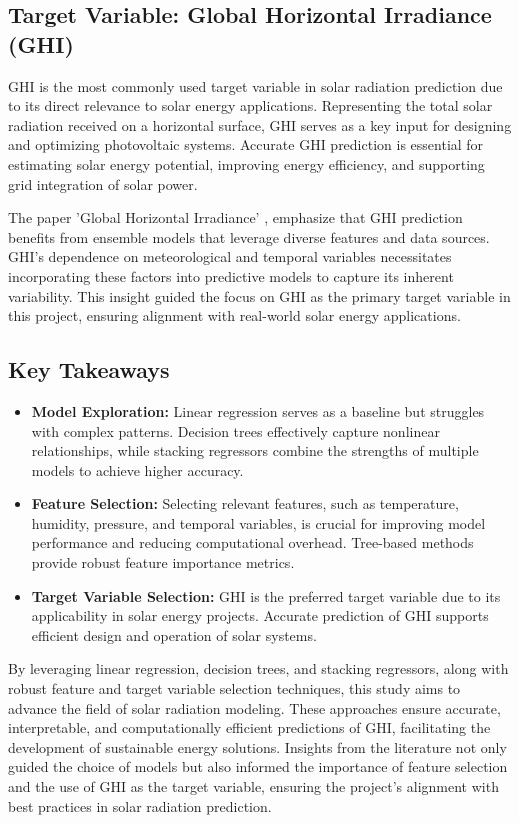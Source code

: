 \documentclass[10pt,twocolumn]{article}
\begin{document}
\subsection{Target Variable: Global Horizontal Irradiance (GHI)}
GHI is the most commonly used target variable in solar radiation prediction due to its direct relevance to solar energy applications. Representing the total solar radiation received on a horizontal surface, GHI serves as a key input for designing and optimizing photovoltaic systems. Accurate GHI prediction is essential for estimating solar energy potential, improving energy efficiency, and supporting grid integration of solar power.

The paper 'Global Horizontal Irradiance' \cite{8}, emphasize that GHI prediction benefits from ensemble models that leverage diverse features and data sources. GHI's dependence on meteorological and temporal variables necessitates incorporating these factors into predictive models to capture its inherent variability. This insight guided the focus on GHI as the primary target variable in this project, ensuring alignment with real-world solar energy applications.

\subsection{Key Takeaways}
\begin{itemize}
    \item \textbf{Model Exploration:} Linear regression serves as a baseline but struggles with complex patterns. Decision trees effectively capture nonlinear relationships, while stacking regressors combine the strengths of multiple models to achieve higher accuracy.
    \item \textbf{Feature Selection:} Selecting relevant features, such as temperature, humidity, pressure, and temporal variables, is crucial for improving model performance and reducing computational overhead. Tree-based methods provide robust feature importance metrics.
    \item \textbf{Target Variable Selection:} GHI is the preferred target variable due to its applicability in solar energy projects. Accurate prediction of GHI supports efficient design and operation of solar systems.
\end{itemize}

By leveraging linear regression, decision trees, and stacking regressors, along with robust feature and target variable selection techniques, this study aims to advance the field of solar radiation modeling. These approaches ensure accurate, interpretable, and computationally efficient predictions of GHI, facilitating the development of sustainable energy solutions. Insights from the literature not only guided the choice of models but also informed the importance of feature selection and the use of GHI as the target variable, ensuring the project's alignment with best practices in solar radiation prediction.
\end{document}
